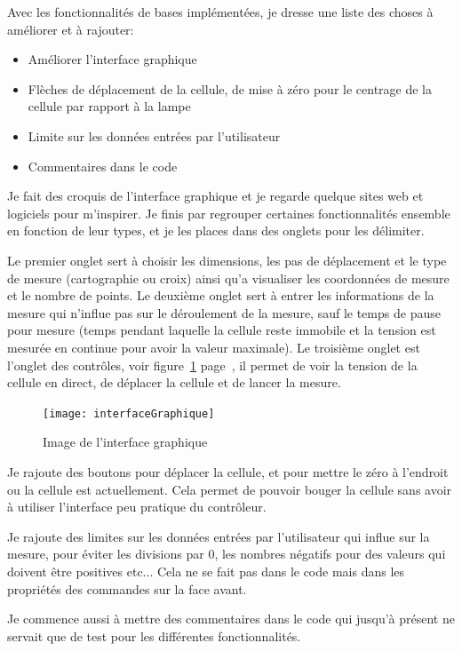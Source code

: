 \documentclass[a4paper, 12pt]{article}
\begin{document}
Avec les fonctionnalités de bases implémentées, je dresse une liste des choses à améliorer et à rajouter:
\begin{itemize}
\item Améliorer l'interface graphique
\item Flèches de déplacement de la cellule, de mise à zéro pour le centrage de la cellule par rapport à la lampe
\item Limite sur les données entrées par l'utilisateur
\item Commentaires dans le code
	\end{itemize}
Je fait des croquis de l'interface graphique et je regarde quelque sites web et logiciels pour m'inspirer.
Je finis par regrouper certaines fonctionnalités ensemble en fonction de leur types, et je les places dans des onglets pour les délimiter.

Le premier onglet sert à choisir les dimensions, les pas de déplacement et le type de mesure (cartographie ou croix) ainsi qu'a visualiser les coordonnées de mesure et le nombre de points.
Le deuxième onglet sert à entrer les informations de la mesure qui n'influe pas sur le déroulement de la mesure, sauf le temps de pause pour mesure (temps pendant laquelle la cellule reste immobile et la tension est mesurée en continue pour avoir la valeur maximale).
Le troisième onglet est l'onglet des contrôles, voir figure~\ref{fig:interfaceGraphique} page~\pageref{fig:interfaceGraphique}, il permet de voir la tension de la cellule en direct, de déplacer la cellule et de lancer la mesure.

\begin{figure}[h]
	\centering
	\texttt{[image: interfaceGraphique]}
	\caption{Image de l'interface graphique}
	\label{fig:interfaceGraphique}
\end{figure}

Je rajoute des boutons pour déplacer la cellule, et pour mettre le zéro à l'endroit ou la cellule est actuellement.
Cela permet de pouvoir bouger la cellule sans avoir à utiliser l'interface peu pratique du contrôleur.

Je rajoute des limites sur les données entrées par l'utilisateur qui influe sur la mesure, pour éviter les divisions par 0, les nombres négatifs pour des valeurs qui doivent être positives etc... Cela ne se fait pas dans le code mais dans les propriétés des commandes sur la face avant.

Je commence aussi à mettre des commentaires dans le code qui jusqu'à présent ne servait que de test pour les différentes fonctionnalités.
\end{document}
